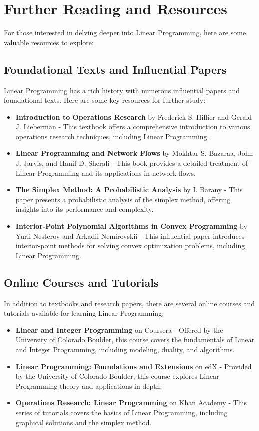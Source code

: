 \documentclass[12pt]{book} %
\begin{document}
\section{Further Reading and Resources}
For those interested in delving deeper into Linear Programming, here are some valuable resources to explore:

\subsection{Foundational Texts and Influential Papers}
Linear Programming has a rich history with numerous influential papers and foundational texts. Here are some key resources for further study:

\begin{itemize}
    \item \textbf{Introduction to Operations Research} by Frederick S. Hillier and Gerald J. Lieberman - This textbook offers a comprehensive introduction to various operations research techniques, including Linear Programming.
    \item \textbf{Linear Programming and Network Flows} by Mokhtar S. Bazaraa, John J. Jarvis, and Hanif D. Sherali - This book provides a detailed treatment of Linear Programming and its applications in network flows.
    \item \textbf{The Simplex Method: A Probabilistic Analysis} by I. Barany - This paper presents a probabilistic analysis of the simplex method, offering insights into its performance and complexity.
    \item \textbf{Interior-Point Polynomial Algorithms in Convex Programming} by Yurii Nesterov and Arkadii Nemirovskii - This influential paper introduces interior-point methods for solving convex optimization problems, including Linear Programming.
\end{itemize}

\subsection{Online Courses and Tutorials}
In addition to textbooks and research papers, there are several online courses and tutorials available for learning Linear Programming:

\begin{itemize}
    \item \textbf{Linear and Integer Programming} on Coursera - Offered by the University of Colorado Boulder, this course covers the fundamentals of Linear and Integer Programming, including modeling, duality, and algorithms.
    \item \textbf{Linear Programming: Foundations and Extensions} on edX - Provided by the University of Colorado Boulder, this course explores Linear Programming theory and applications in depth.
    \item \textbf{Operations Research: Linear Programming} on Khan Academy - This series of tutorials covers the basics of Linear Programming, including graphical solutions and the simplex method.
\end{itemize}
\end{document}
